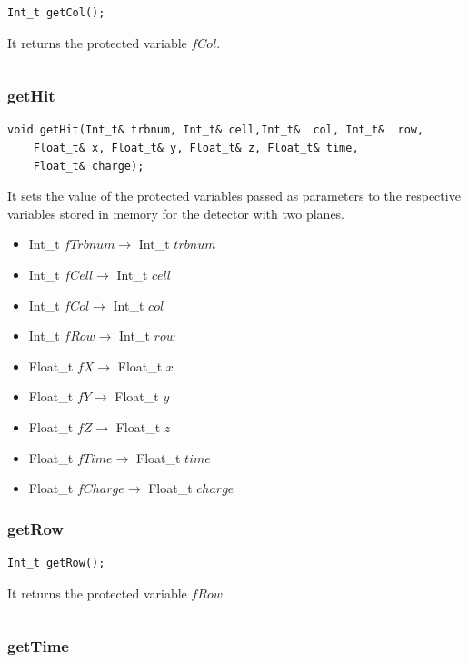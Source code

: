 \documentclass[a4paper]{book}
\begin{document}
\begin{lstlisting}
Int_t getCol();
\end{lstlisting}

It returns the protected variable $fCol$.

\[\]

\subsubsection{getHit}

\begin{lstlisting}
void getHit(Int_t& trbnum, Int_t& cell,Int_t&  col, Int_t&  row,
	Float_t& x, Float_t& y, Float_t& z, Float_t& time,
	Float_t& charge);
\end{lstlisting}

It sets the value of the protected variables passed as parameters to the respective variables stored in memory for the detector with two planes.

\begin{itemize}
	\item Int\_t $fTrbnum \rightarrow$ Int\_t $trbnum$
	\item Int\_t $fCell \rightarrow$ Int\_t $cell$
	\item Int\_t $fCol \rightarrow$ Int\_t $col$
	\item Int\_t $fRow \rightarrow$ Int\_t $row$
	\item Float\_t $fX \rightarrow$ Float\_t $x$
	\item Float\_t $fY \rightarrow$ Float\_t $y$
	\item Float\_t $fZ \rightarrow$ Float\_t $z$
	\item Float\_t $fTime \rightarrow$ Float\_t $time$
	\item Float\_t $fCharge \rightarrow$ Float\_t $charge$
\end{itemize}



\subsubsection{getRow}

\begin{lstlisting}
Int_t getRow();
\end{lstlisting}

It returns the protected variable $fRow$.

\[\]

\subsubsection{getTime}
\end{document}
